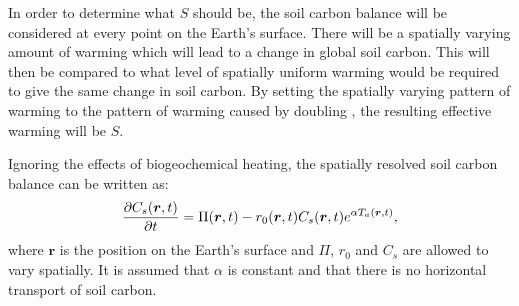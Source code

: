 In order to determine what $S$ should be, the soil carbon balance will be considered at every point on the Earth's surface. There will be a spatially varying amount of warming which will
lead to a change in global soil carbon. This will then be compared to what level of spatially uniform warming would be required to give the same change in soil carbon. By setting the spatially varying
pattern of warming to the pattern of warming caused by doubling , the resulting effective warming will be $S$.

Ignoring the effects of biogeochemical heating, the spatially resolved soil carbon balance can be written as:
\begin{equation}
  \label{eq:spatially_resolved_soil_carbon}
  \pdv{C_s(\bm{r},t)}{t} = \Pi(\bm{r},t) - r_0(\bm{r},t)C_s(\bm{r},t)e^{\alpha T_a(\bm{r},t)},
\end{equation}
where $\bm{r}$ is the position on the Earth's surface and $\Pi$, $r_0$ and $C_s$ are allowed to vary spatially. It is assumed that $\alpha$ is constant and that there is no
horizontal transport of soil carbon.

